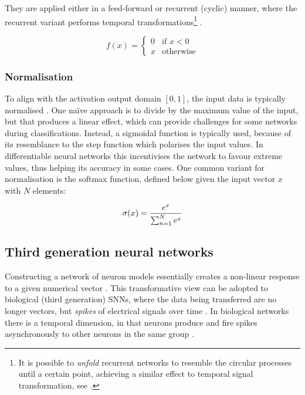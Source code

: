 \documentclass[report.tex]{subfiles}
\begin{document}
They are applied either in a feed-forward or recurrent (cyclic) manner, where
the recurrent variant performs temporal transformations\footnote{It is possible to \textit{unfold} recurrent
networks to resemble the circular processes until a certain point, achieving
a similar effect to temporal signal transformation, see \cite{Mozer1995}.}
\cite{Schmidhuber2014}.

\begin{equation} \label{eq:ReLU}
f(x) = \begin{cases}
         0 & \text{if } x < 0 \\
	 x & \text{otherwise}
       \end{cases}
\end{equation}

\subsubsection{Normalisation}
To align with the activation output domain $[0, 1]$, the input data
is typically normalised \cite{Bishop2006}.
One naïve approach is to divide by the maximum value of the input, but
that produces a linear effect, which can provide challenges for some networks
during classifications.
Instead, a sigmoidal function is typically used, because of its resemblance to
the step function which polarises the input values. 
In differentiable neural networks this incentivises the network to favour
extreme values, thus helping its accuracy in some cases.
One common variant for normalisation is the softmax
function, defined below given the input vector $x$ with $N$ elements:

\begin{equation}
  \sigma(x) = { e^x \over \sum^N_{n=1} e^x}
  \label{eq:softmax}
\end{equation}

\subsection{Third generation neural networks}
Constructing a network of neuron models essentially creates a non-linear
response to a given numerical vector \cite{Russel2007}.
This transformative view can be adopted to biological (third generation)
\glspl{SNN}, where the data being transferred are no longer vectors, but 
\textit{spikes}
of electrical signals over time \cite[p. 32]{Dayan2001, Eliasmith2004}.
In biological networks there is a temporal dimension, in that neurons
produce and fire spikes asynchronously to other neurons in the same
group \cite{Eliasmith2004}.
\end{document}
